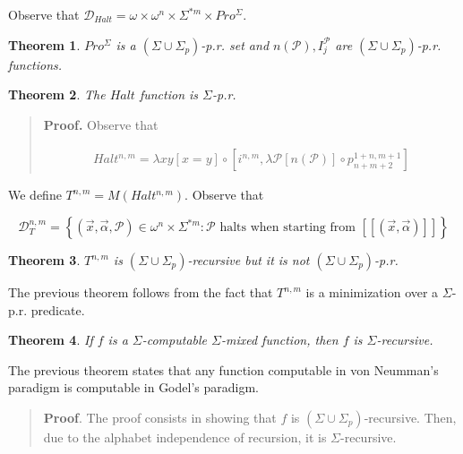 \documentclass[a4paper, 12pt]{article}
\newtheorem{theorem}{Theorem}
\newtheorem{theorem}{Theorem}
\begin{document}
Observe that $\mathcal{D}_{Halt} = \omega \times \omega^{n} \times \Sigma^{*m}
\times Pro^{\Sigma}$.

\begin{theorem}
    $Pro^{\Sigma}$ is a $( \Sigma \cup \Sigma_p )$-p.r. set and $n(\mathcal{P}),
    I_{j}^{\mathcal{P}}$ are $( \Sigma \cup \Sigma_p )$-p.r. functions.
\end{theorem}

\begin{theorem}
    The $Halt$ function is $\Sigma$-p.r. 
\end{theorem}


\small
\begin{quote}

\textbf{Proof.} Observe that 

\begin{align*}
    Halt^{n, m} = \lambda xy \left[ x = y  \right] \circ \left[ i^{n, m},
    \lambda \mathcal{P} \left[ n(\mathcal{P})  \right] \circ p_{n+m+2}^{1+n, m +
1} \right] 
\end{align*}

\end{quote}
\normalsize

We define $T^{n, m} = M(Halt^{n, m})$. Observe that 

$$\mathcal{D}_T^{n, m} =
\left\{ (\vec{x}, \vec{\alpha}, \mathcal{P}) \in \omega^{n} \times \Sigma^{*m} : \mathcal{P}
\text{ halts when starting from } [\![ (\vec{x}, \vec{\alpha})  ]\!]\right\} $$

\begin{theorem}
    $T^{n, m}$ is $( \Sigma \cup \Sigma_p )$-recursive but it is not $( \Sigma
    \cup \Sigma_p )$-p.r. 
\end{theorem}

The previous theorem follows from the fact that $T^{n, m}$ is a minimization
over a $\Sigma$-p.r. predicate.

\begin{theorem}
    If $f$ is a $\Sigma$-computable $\Sigma$-mixed function, then $f$ is
    $\Sigma$-recursive.
\end{theorem}

The previous theorem states that any function computable in von Neumman's
paradigm is computable in Godel's paradigm.


\small
\begin{quote}

\textbf{Proof}. The proof consists in showing that $f$ is $( \Sigma \cup
\Sigma_p )$-recursive. Then, due to the alphabet independence of recursion, it
is $\Sigma$-recursive.

\end{quote}
\normalsize
\end{document}
